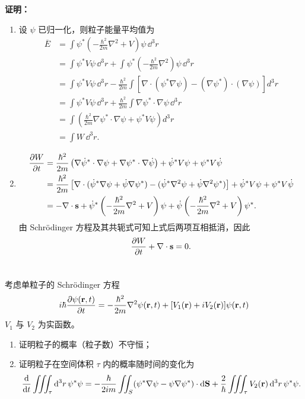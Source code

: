 \documentclass[12pt,a4paper]{article}
\begin{document}
\noindent\textbf{证明：} 
\begin{enumerate}[label=(\alph*)]
    \item 设 $\psi$ 已归一化，则粒子能量平均值为
    \begin{align*}
      \overline{E} &= \int \psi^*\left(-\frac{\hbar^2}{2m}\nabla^2 + V\right)\psi\, \dd^3r \\
      &= \int \psi^* V \psi\, \dd^3r + \int \psi^*\left(-\frac{\hbar^2}{2m}\nabla^2\right)\psi\, \dd^3r \\
      &= \int \psi^* V \psi\, \dd^3r -\frac{\hbar^2}{2m}\int \left[\nabla\cdot(\psi^*\nabla\psi) - (\nabla\psi^*)\cdot(\nabla\psi)\right] d^3r \\
      &= \int \psi^* V \psi\, \dd^3r + \frac{\hbar^2}{2m}\int \nabla\psi^*\cdot\nabla\psi\, \dd^3r \\
      &=\int \left(\frac{\hbar^2}{2m}\nabla\psi^*\cdot\nabla\psi + \psi^*V\psi\right)d^3r \\
      &= \int W\, \dd^3r.
    \end{align*}

    \item 
    \begin{align*}
      \pdv{W}{t} &= \frac{\hbar^2}{2m}\left(\nabla \dot{\psi}^* \cdot \nabla \psi + \nabla \psi^* \cdot \nabla \dot{\psi}\right) + \dot{\psi}^* V\psi + \psi^* V\dot{\psi} \\
      &= \frac{\hbar^2}{2m}\left[\nabla\cdot(\dot{\psi}^*\nabla\psi + \dot{\psi}\nabla\psi^*) - (\dot{\psi}^*\nabla^2\psi + \dot{\psi}\nabla^2\psi^*)\right] + \dot{\psi}^*V\psi + \psi^*V\dot{\psi} \\
      &= -\nabla\cdot\vb{s} + \dot{\psi}^*\left(-\frac{\hbar^2}{2m}\nabla^2 + V\right)\psi + \dot{\psi}\left(-\frac{\hbar^2}{2m}\nabla^2 + V\right)\psi^*.
    \end{align*}
    由 Schr\"odinger 方程及其共轭式可知上式后两项互相抵消，因此
    \[
    \pdv{W}{t} + \nabla\cdot\vb{s} = 0.
    \]
\end{enumerate}

\section{}
考虑单粒子的 Schr\"odinger 方程
\[
 i\hbar \pdv{\psi(\vb{r},t)}{t}
 = -\frac{\hbar^2}{2m}\nabla^2\psi(\vb{r},t)
 + [V_1(\vb{r})+iV_2(\vb{r})]\psi(\vb{r},t)
\]
$V_1$ 与 $V_2$ 为实函数。

\begin{enumerate}[label=(\alph*)]
    \item 证明粒子的概率（粒子数）不守恒；
    \item 证明粒子在空间体积 $\tau$ 内的概率随时间的变化为
    \[
    \dv{}{t}\iiint_\tau \dd^3r\, \psi^*\psi
    = -\frac{\hbar}{2im}\iint_S (\psi^*\nabla\psi - \psi\nabla\psi^*)\cdot \dd\vb{S}
    + \frac{2}{\hbar}\iiint_\tau V_2(\vb{r})\, \dd^3r\, \psi^*\psi.
    \]
\end{enumerate}
\end{document}
